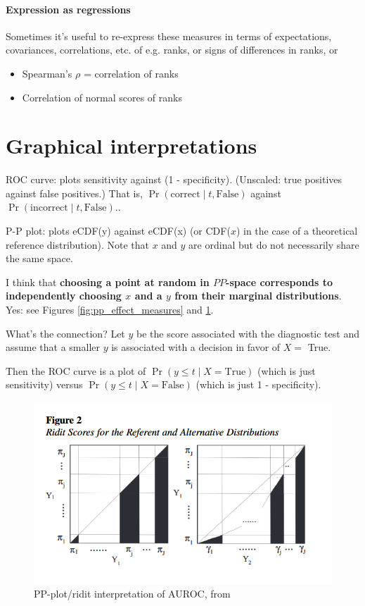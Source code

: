 \documentclass[
  11pt,
  fleqn
]{article}
\begin{document}
\paragraph{Expression as regressions} Sometimes it's useful to
re-express these measures in terms of expectations, covariances,
correlations, etc. of e.g. ranks, or signs of differences in ranks, or

\begin{itemize}
  \item Spearman's $\rho$ = correlation of ranks
  \item Correlation of normal scores of ranks
\end{itemize}

\section{Graphical interpretations}

ROC curve: plots sensitivity against (1 - specificity). (Unscaled:
true positives against false positives.) That is, $\Pr(\text{correct}
\mid t, \text{False})$ against $\Pr(\text{incorrect} \mid t, \text{False})$..

P-P plot: plots eCDF(y) against eCDF(x) (or CDF($x$) in the case of a
theoretical reference distribution). Note that $x$ and $y$ are
ordinal but do not necessarily share the same space.

I think that \textbf{choosing a point at random in $PP$-space
  corresponds to independently choosing $x$ and a $y$ from their
marginal distributions}. Yes: see Figures
\ref{fig:pp_effect_measures} and \ref{fig:pp_ridit}.

What's the connection? Let $y$ be the score associated with the
diagnostic test and assume that a smaller $y$ is associated with a
decision in favor of $X =$ True.

Then the ROC curve is a plot of $\Pr(y \leq t \mid X = \text{True})$
(which is just sensitivity)
versus $\Pr(y \leq t \mid X = \text{False})$ (which is just 1 - specificity).

\begin{figure}
  \includegraphics[width=5in]{PP_or_ridit_interpretation_of_AUROC.png}
  \caption{PP-plot/ridit interpretation of AUROC, from
  \citet{smithsonReceiverOperatingCharacteristic2023}}
  \label{fig:pp_ridit}
\end{figure}
\end{document}
